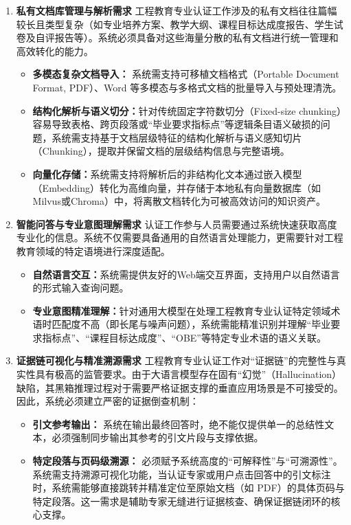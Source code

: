 \documentclass[UTF8,a4paper,zihao=-4]{ctexart}
\begin{document}
\begin{enumerate}
    \item \textbf{私有文档库管理与解析需求} 工程教育专业认证工作涉及的私有文档往往篇幅较长且类型复杂（如专业培养方案、教学大纲、课程目标达成度报告、学生试卷及自评报告等）。系统必须具备对这些海量分散的私有文档进行统一管理和高效转化的能力。
    \begin{itemize}
        \item \textbf{多模态复杂文档导入：} 系统需支持可移植文档格式（Portable Document Format, PDF）、Word 等多模态与多格式文档的批量导入与预处理清洗。
        \item \textbf{结构化解析与语义切分：}针对传统固定字符数切分（Fixed-size chunking）容易导致表格、跨页段落或“毕业要求指标点”等逻辑条目语义破损的问题，系统需支持基于文档层级特征的结构化解析与语义感知切片（Chunking），提取并保留文档的层级结构信息与完整语境。
        \item \textbf{向量化存储：}系统需支持将解析后的非结构化文本通过嵌入模型（Embedding）转化为高维向量，并存储于本地私有向量数据库（如Milvus或Chroma）中，将离散文档转化为可被高效访问的知识资产。
    \end{itemize}
    
    \item \textbf{智能问答与专业意图理解需求} 认证工作参与人员需要通过系统快速获取高度专业化的信息。系统不仅需要具备通用的自然语言处理能力，更需要针对工程教育领域的特定语境进行深度适配。
    \begin{itemize}
        \item \textbf{自然语言交互：}系统需提供友好的Web端交互界面，支持用户以自然语言的形式输入查询问题。
        \item \textbf{专业意图精准理解：}针对通用大模型在处理工程教育专业认证特定领域术语时匹配度不高（即长尾与噪声问题），系统需能精准识别并理解“毕业要求指标点”、“课程目标达成度”、“OBE”等特定专业术语的语义关联。
    \end{itemize}

    \item \textbf{证据链可视化与精准溯源需求} 工程教育专业认证工作对“证据链”的完整性与真实性具有极高的监管要求。由于大语言模型存在固有“幻觉”（Hallucination）缺陷，其黑箱推理过程对于需要严格证据支撑的垂直应用场景是不可接受的。因此，系统必须建立严密的证据倒查机制：
    \begin{itemize}
        \item \textbf{引文参考输出：}  系统在输出最终回答时，绝不能仅提供单一的总结性文本，必须强制同步输出其参考的引文片段与支撑依据。
        \item \textbf{特定段落与页码级溯源：} 必须赋予系统高度的“可解释性”与“可溯源性”。系统需支持溯源可视化功能，当认证专家或用户点击回答中的引文标注时，系统需能够直接跳转并精准定位至原始文档（如 PDF）的具体页码与特定段落。这一需求是辅助专家无缝进行证据核查、确保证据链闭环的核心支撑。
    \end{itemize}
\end{enumerate}
\end{document}
